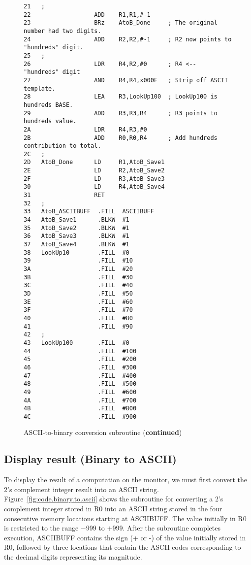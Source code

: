 \documentclass{patt}
\begin{document}
\begin{figure}[H]
\begin{minipage}{36pc}
\begin{Verbatim}[fontsize=\fontsize{9}{11}\selectfont]
21   ;
22                  ADD    R1,R1,#-1
23                  BRz    AtoB_Done     ; The original number had two digits.
24                  ADD    R2,R2,#-1     ; R2 now points to "hundreds" digit.
25   ;
26                  LDR    R4,R2,#0      ; R4 <-- "hundreds" digit
27                  AND    R4,R4,x000F   ; Strip off ASCII template.
28                  LEA    R3,LookUp100  ; LookUp100 is hundreds BASE.
29                  ADD    R3,R3,R4      ; R3 points to hundreds value.
2A                  LDR    R4,R3,#0
2B                  ADD    R0,R0,R4      ; Add hundreds contribution to total.
2C   ;
2D   AtoB_Done      LD     R1,AtoB_Save1
2E                  LD     R2,AtoB_Save2
2F                  LD     R3,AtoB_Save3
30                  LD     R4,AtoB_Save4
31                  RET
32   ;
33   AtoB_ASCIIBUFF  .FILL  ASCIIBUFF
34   AtoB_Save1      .BLKW  #1
35   AtoB_Save2      .BLKW  #1
36   AtoB_Save3      .BLKW  #1
37   AtoB_Save4      .BLKW  #1
38   LookUp10        .FILL  #0
39                   .FILL  #10
3A                   .FILL  #20
3B                   .FILL  #30
3C                   .FILL  #40
3D                   .FILL  #50
3E                   .FILL  #60
3F                   .FILL  #70
40                   .FILL  #80
41                   .FILL  #90
42   ;
43   LookUp100       .FILL  #0
44                   .FILL  #100
45                   .FILL  #200
46                   .FILL  #300
47                   .FILL  #400
48                   .FILL  #500
49                   .FILL  #600
4A                   .FILL  #700
4B                   .FILL  #800
4C                   .FILL  #900
\end{Verbatim}
\caption{ASCII-to-binary conversion subroutine ({\bf continued})}
\end{minipage}
\end{figure}


\FloatBarrier
\subsection{Display result (Binary to ASCII)}

To display the result of a computation on the monitor, we must first convert 
the 2's complement integer result into an ASCII string.
Figure~\ref{fig:code.binary.to.ascii} shows the subroutine for
converting a 2's complement integer stored in R0 into an ASCII string
stored in the four consecutive memory locations starting at
ASCIIBUFF. The value initially in R0 is restricted to the
range $-$999 to $+$999. After the subroutine completes execution,
ASCIIBUFF contains the sign (+ or -) of the value initially stored in R0, 
followed by three locations that contain the ASCII codes corresponding
to the decimal digits representing its magnitude.
\end{document}
